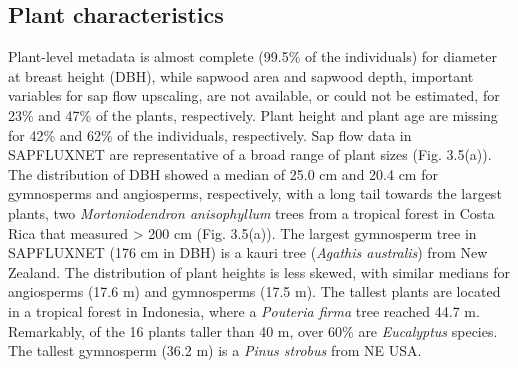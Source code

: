 \documentclass[11pt,twoside]{reedthesis}
\begin{document}
\subsection{Plant characteristics}\label{plant-characteristics}

Plant-level metadata is almost complete (99.5\% of the individuals) for
diameter at breast height (DBH), while sapwood area and sapwood depth,
important variables for sap flow upscaling, are not available, or could
not be estimated, for 23\% and 47\% of the plants, respectively. Plant
height and plant age are missing for 42\% and 62\% of the individuals,
respectively. Sap flow data in SAPFLUXNET are representative of a broad
range of plant sizes (Fig. 3.5(a)). The distribution of DBH showed a
median of 25.0 cm and 20.4 cm for gymnosperms and angiosperms,
respectively, with a long tail towards the largest plants, two
\emph{Mortoniodendron anisophyllum} trees from a tropical forest in
Costa Rica that measured \textgreater{} 200 cm (Fig. 3.5(a)). The
largest gymnosperm tree in SAPFLUXNET (176 cm in DBH) is a kauri tree
(\emph{Agathis australis}) from New Zealand. The distribution of plant
heights is less skewed, with similar medians for angiosperms (17.6 m)
and gymnosperms (17.5 m). The tallest plants are located in a tropical
forest in Indonesia, where a \emph{Pouteria firma} tree reached 44.7 m.
Remarkably, of the 16 plants taller than 40 m, over 60\% are
\emph{Eucalyptus} species. The tallest gymnosperm (36.2 m) is a
\emph{Pinus strobus} from NE USA.\par
\end{document}
